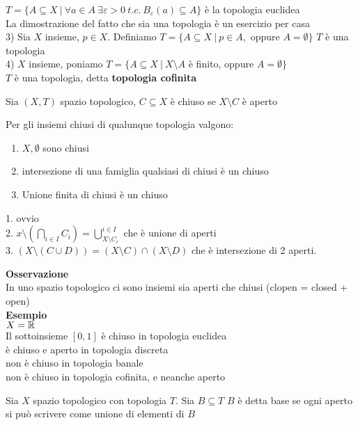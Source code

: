 \documentclass[12px]{article}
\begin{document}
	$T = \{ A\subseteq X \ | \ \forall a\in A \ \exists \varepsilon > 0 \ t.c. \ B_\varepsilon(a)\subseteq A\}$ è la topologia euclidea\\
	La dimostrazione del fatto che sia una topologia è un esercizio per casa\\
	3) Sia $X$ insieme, $p\in X$. Definiamo  $T = \{A\subseteq X \ | \ p\in A, $ oppure $A = \emptyset\}$  $T$ è una topologia\\
	4) $X$ insieme, poniamo $T = \{A\subseteq X \ | \ X\setminus A $ è finito, oppure $A = \emptyset\}$\\
$T$ è una topologia, detta \textbf{topologia cofinita}\\
\begin{defi}
	Sia $(X,T)$ spazio topologico, $C\subseteq X$ è chiuso se $X\setminus C$ è aperto 
\end{defi}
\begin{lemm}
Per gli insiemi chiusi di qualunque topologia valgono:
	\begin{enumerate}
		\item $X,\emptyset$ sono chiusi
		\item intersezione di una famiglia qualsiasi di chiusi è un chiuso
		\item Unione finita di chiusi è un chiuso
	\end{enumerate}
\end{lemm}
\begin{dimo}
	1. ovvio\\
	2. $\displaystyle x\setminus \left( \bigcap_{i\in I}C_i \right) = \bigcup^{i\in I}_{X\setminus C_i}$ che è unione di aperti\\
	3. $(X\setminus(C\cup D)) = (X\setminus C)\cap (X\setminus D)$ che è intersezione di 2 aperti.
\end{dimo}
\textbf{Osservazione}\\
In uno spazio topologico ci sono insiemi sia aperti che chiusi (clopen = closed + open)\\
\textbf{Esempio}\\
$X = \mathbb{R}$\\ 
Il sottoinsieme  $[0,1]$ è chiuso in topologia euclidea\\
è chiuso e aperto in topologia discreta\\
non è chiuso in topologia banale\\
non è chiuso in topologia cofinita, e neanche aperto\\
\begin{defi}
	Sia $X$ spazio topologico con topologia $T$. Sia $B\subseteq T$  $B$ è detta base se ogni aperto si può scrivere come unione di elementi di $B$
\end{defi}
\end{document}
